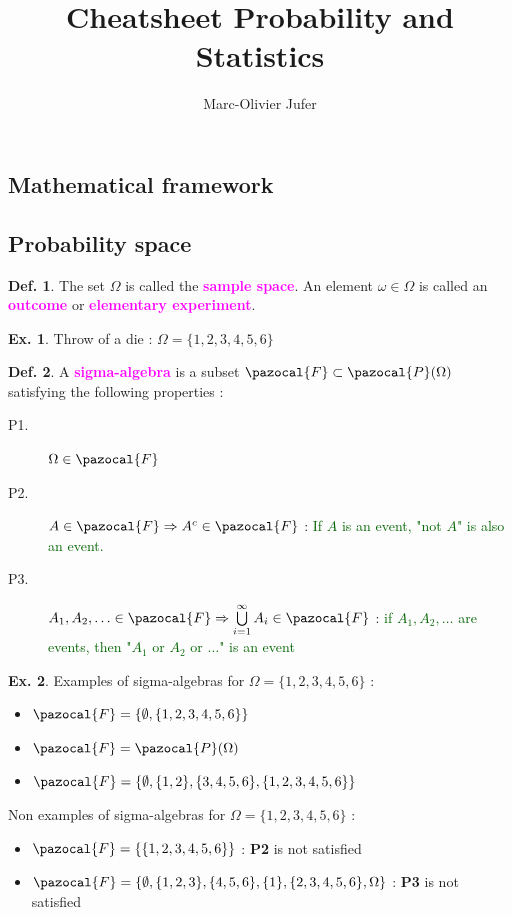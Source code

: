 \documentclass[8pt,a4paper,landscape]{article}
\author{Marc-Olivier Jufer}
\title{Cheatsheet Probability and Statistics}
\theoremstyle{definition}
\newtheorem{definition}{Def.}[section]
\theoremstyle{example}
\newtheorem{example}{Ex.}[section]
\theoremstyle{intuition}
\theoremstyle{definition}
\newcommand{\Fb}{\pazocal{F}}
\newcommand{\Pb}{\pazocal{P}}
\newcommand{\mydef}[1]{\textcolor{magenta}{\textbf{#1}}}
\begin{document}
\begin{multicols}{3}
	\maketitle
	
	
	\section{Mathematical framework}
			\subsection{Probability space}
			
			
				\begin{definition}
					The set $\Omega$ is called the \mydef{sample space}. An element $\omega \in \Omega$ is called an \mydef{outcome} or \mydef{elementary experiment}.
				\end{definition}
				\begin{example}
					Throw of a die : $\Omega = \{1,2,3,4,5,6\}$
				\end{example}
				
				
				\begin{definition} \label{dsa}
					A \mydef{sigma-algebra} is a subset $\Fb \subset \Pb (\Omega)$ satisfying the following properties :
					\begin{description}
						\item[P1.] $\Omega \in \Fb$
						\item[P2.] $A \in \Fb \Rightarrow A^c \in \Fb$ : \textcolor{DarkGreen}{If $A$ is an event, "not $A$" is also an event.}
						\item[P3.] $A_1, A_2, \ldots \in \Fb \Rightarrow \bigcup\limits_{i=1}^{\infty}A_i \in \Fb$ : \textcolor{DarkGreen}{if $A_1, A_2, \ldots$ are events, then "$A_1$ or $A_2$ or $\ldots$" is an event}
					\end{description}
				\end{definition}
				\begin{example}
					Examples of sigma-algebras for $\Omega = \{1,2,3,4,5,6\}$ :
					\begin{itemize}
						\item $\Fb = \{\emptyset, \{1,2,3,4,5,6\}\}$
						\item $\Fb = \Pb(\Omega)$
						\item $\Fb = \{\emptyset, \{1,2\}, \{3,4,5,6\}, \{1,2,3,4,5,6\}\}$
					\end{itemize}
					Non examples of sigma-algebras for $\Omega = \{1,2,3,4,5,6\}$ :
					\begin{itemize}
						\item $\Fb  = \{\{1,2,3,4,5,6\}\}$ : \textbf{P2} is not satisfied
						\item $\Fb = \{\emptyset, \{1,2,3\},\{4,5,6\},\{1\},\{2,3,4,5,6\},\Omega\}$ : \textbf{P3} is not satisfied
					\end{itemize}
				\end{example}
				

\end{multicols}
\end{document}
